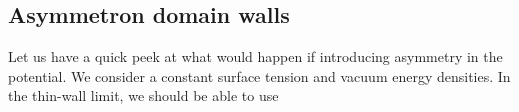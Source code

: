 \subsection{Asymmetron domain walls}
    Let us have a quick peek at what would happen if introducing asymmetry in the potential. We consider a constant surface tension and vacuum energy densities. In the thin-wall limit, we should be able to use 
























